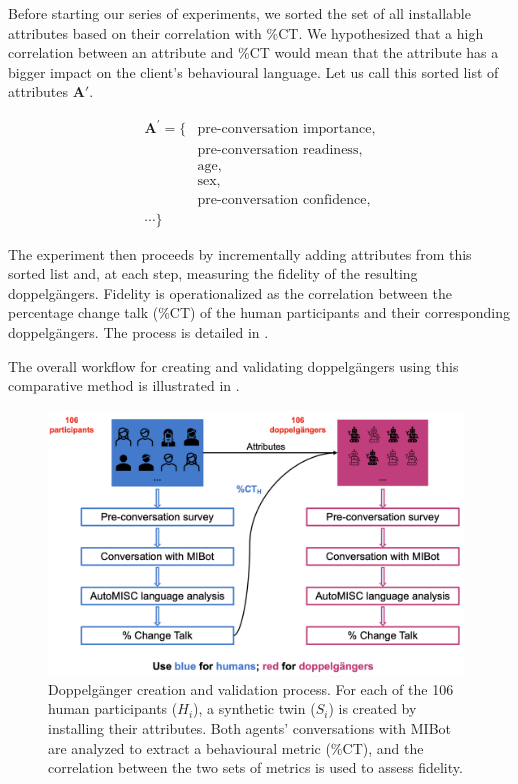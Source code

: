 Before starting our series of experiments, we sorted the set of all installable attributes based on their correlation with \%CT. We hypothesized that a high correlation between an attribute and \%CT would mean that the attribute has a bigger impact on the client's behavioural language. Let us call this sorted list of attributes $\mathbf{A'}$.

$$
	\begin{aligned}
		{\textbf{A}}^{'} = \{ & \text{pre-conversation importance,} \\
		                      & \text{pre-conversation readiness,}  \\
		                      & \text{age,}                         \\
		                      & \text{sex,}                         \\
		                      & \text{pre-conversation confidence,} \\
		\cdots \}
	\end{aligned}
$$

The experiment then proceeds by incrementally adding attributes from this sorted list and, at each step, measuring the fidelity of the resulting doppelgängers. Fidelity is operationalized as the correlation between the percentage change talk (\%CT) of the human participants and their corresponding doppelgängers. The process is detailed in .


The overall workflow for creating and validating doppelgängers using this comparative method is illustrated in .

\begin{figure}[htpb]
	\centering
	\includegraphics[width=0.98\textwidth]{fig/doppelganger-study.png}
	\caption[Doppelgänger creation and validation process]{Doppelgänger creation and validation process. For each of the 106 human participants ($H_i$), a synthetic twin ($S_i$) is created by installing their attributes. Both agents' conversations with MIBot are analyzed to extract a behavioural metric (\%CT), and the correlation between the two sets of metrics is used to assess fidelity.}
	\label{fig:doppelgänger-study}
\end{figure}

